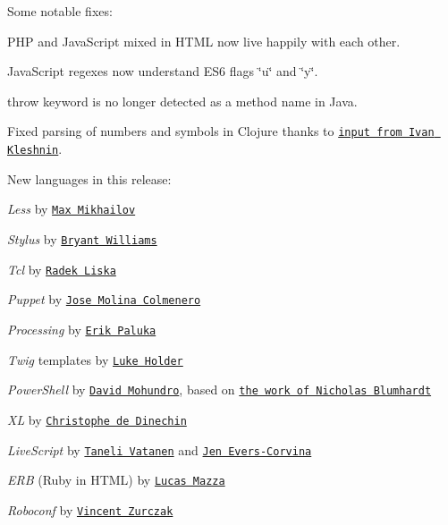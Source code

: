 Some notable fixes\+:


\begin{DoxyItemize}
\item P\+HP and Java\+Script mixed in H\+T\+ML now live happily with each other.
\item Java\+Script regexes now understand E\+S6 flags \char`\"{}u\char`\"{} and \char`\"{}y\char`\"{}.
\item {\ttfamily throw} keyword is no longer detected as a method name in Java.
\item Fixed parsing of numbers and symbols in Clojure thanks to \href{http://kalnitsky.org.ua/}{\tt input from Ivan Kleshnin}.
\end{DoxyItemize}

New languages in this release\+:


\begin{DoxyItemize}
\item {\itshape Less} by \href{https://github.com/seven-phases-max}{\tt Max Mikhailov}
\item {\itshape Stylus} by \href{https://github.com/scien}{\tt Bryant Williams}
\item {\itshape Tcl} by \href{https://github.com/Nindaleth}{\tt Radek Liska}
\item {\itshape Puppet} by \href{https://github.com/Moliholy}{\tt Jose Molina Colmenero}
\item {\itshape Processing} by \href{https://github.com/paluka}{\tt Erik Paluka}
\item {\itshape Twig} templates by \href{https://github.com/lukeholder}{\tt Luke Holder}
\item {\itshape Power\+Shell} by \href{https://github.com/drmohundro}{\tt David Mohundro}, based on \href{https://github.com/OctopusDeploy/Library/blob/master/app/shared/presentation/highlighting/powershell.js}{\tt the work of Nicholas Blumhardt}
\item {\itshape XL} by \href{https://github.com/c3d}{\tt Christophe de Dinechin}
\item {\itshape Live\+Script} by \href{https://github.com/Daiz-}{\tt Taneli Vatanen} and \href{https://github.com/sevvie}{\tt Jen Evers-\/\+Corvina}
\item {\itshape E\+RB} (Ruby in H\+T\+ML) by \href{https://github.com/lucasmazza}{\tt Lucas Mazza}
\item {\itshape Roboconf} by \href{https://github.com/vincent-zurczak}{\tt Vincent Zurczak}
\end{DoxyItemize}

